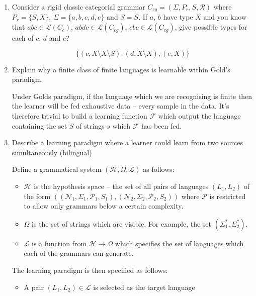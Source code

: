 \documentclass[10pt,\jkfside,a4paper]{article}
\begin{document}
\begin{enumerate}

\item Consider a rigid classic categorial grammar $C_{cg} = (\Sigma, P_r, S,
\mathcal R)$ where $P_r = \{S, X\}$, $\Sigma = \{a, b, c, d, e\}$ and $S =
S$. If $a$, $b$ have type $X$ and you know that $abc \in \mathcal L(C_{c})$,
$abdc \in \mathcal L(C_{cg})$, $ebc \in \mathcal L(C_{cg})$, give possible
types for each of $c$, $d$ and $e$?

\[
\{(c, X \setminus X \setminus S), (d, X \setminus X), (e, X)\}
\]

\item Explain why a finite class of finite languages is learnable within
Gold's paradigm.

Under Golds paradigm, if the language which we are recognising is finite
then the learner will be fed exhaustive data -- every sample in the data.
It's therefore trivial to build a learning function $\mathcal F$ which
output the language containing the set $S$ of strings $s$ which
$\mathcal F$ has been fed.

\item Describe a learning paradigm where a learner could learn from two
sources simultaneously (bilingual)

Define a grammatical system $(\mathcal H, \Omega, \mathcal L)$ as follows:
\begin{itemize}

\item $\mathcal H$ is the hypothesis space -- the set of all pairs of
languages $(L_1, L_2)$ of the form
$((\mathcal N_1, \Sigma_1, \mathcal P_1, S_1),
(\mathcal N_2, \Sigma_2, \mathcal P_2, S_2))$ where $\mathcal P$ is
restricted to allow only grammars below a certain complexity.

\item $\Omega$ is the set of strings which are visible. For example, the set
$(\Sigma_1^*, \Sigma_2^*)$.

\item $\mathcal L$ is a function from $\mathcal H \to \Omega$ which
specifies the set of languages which each of the grammars can generate.

\end{itemize}

The learning paradigm is then specified as follows:

\begin{itemize}

\item A pair $(L_1, L_2) \in \mathcal L$ is selected as the target language


\end{itemize}
\end{enumerate}
\end{document}
